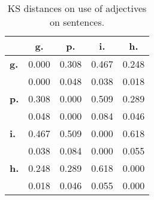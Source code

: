 \begin{table}[h!]
\begin{center}
\begin{tabular}{| l || c | c | c | c |}\hline
 & {\bf g.} & {\bf p.} & {\bf i.} & {\bf h.} \\\hline\hline
{\bf g.} & 0.000 & 0.308 & 0.467 & 0.248 \\
{\bf } & 0.000 & 0.048 & 0.038 & 0.018 \\\hline
{\bf p.} & 0.308 & 0.000 & 0.509 & 0.289 \\
{\bf } & 0.048 & 0.000 & 0.084 & 0.046 \\\hline
{\bf i.} & 0.467 & 0.509 & 0.000 & 0.618 \\
{\bf } & 0.038 & 0.084 & 0.000 & 0.055 \\\hline
{\bf h.} & 0.248 & 0.289 & 0.618 & 0.000 \\
{\bf } & 0.018 & 0.046 & 0.055 & 0.000 \\\hline
\end{tabular}
\caption{KS distances on use of adjectives on sentences.}
\end{center}
\end{table}